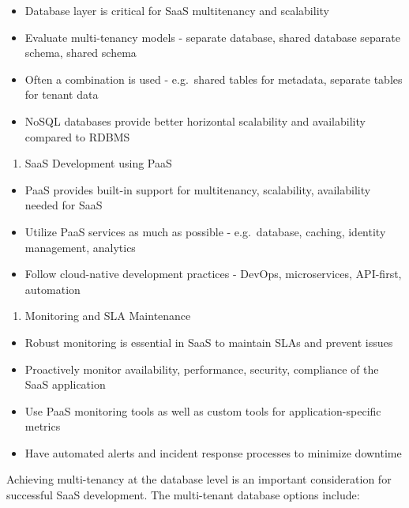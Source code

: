 \documentclass[10pt, landscape]{article}
\begin{document}
\begin{multicols*}{4}
\begin{itemize}
\tightlist
\item
  Database layer is critical for SaaS multitenancy and scalability
\item
  Evaluate multi-tenancy models - separate database, shared database
  separate schema, shared schema
\item
  Often a combination is used - e.g.~shared tables for metadata,
  separate tables for tenant data
\item
  NoSQL databases provide better horizontal scalability and availability
  compared to RDBMS
\end{itemize}

\begin{enumerate}
\def\labelenumi{\arabic{enumi}.}
\setcounter{enumi}{4}
\tightlist
\item
  SaaS Development using PaaS
\end{enumerate}

\begin{itemize}
\tightlist
\item
  PaaS provides built-in support for multitenancy, scalability,
  availability needed for SaaS
\item
  Utilize PaaS services as much as possible - e.g.~database, caching,
  identity management, analytics
\item
  Follow cloud-native development practices - DevOps, microservices,
  API-first, automation
\end{itemize}

\begin{enumerate}
\def\labelenumi{\arabic{enumi}.}
\setcounter{enumi}{5}
\tightlist
\item
  Monitoring and SLA Maintenance
\end{enumerate}

\begin{itemize}
\tightlist
\item
  Robust monitoring is essential in SaaS to maintain SLAs and prevent
  issues
\item
  Proactively monitor availability, performance, security, compliance of
  the SaaS application
\item
  Use PaaS monitoring tools as well as custom tools for
  application-specific metrics
\item
  Have automated alerts and incident response processes to minimize
  downtime
\end{itemize}

Achieving multi-tenancy at the database level is an important
consideration for successful SaaS development. The multi-tenant database
options include:


\end{multicols*}
\end{document}
